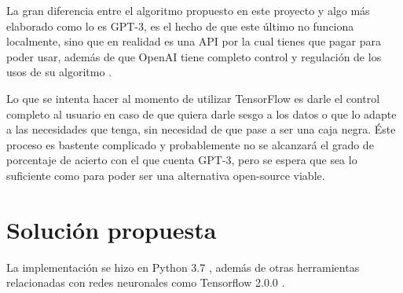 \documentclass[a4]{sciposter}
\begin{document}
\begin{multicols}{2}


La gran diferencia entre el algoritmo propuesto en este proyecto y algo más elaborado como lo es GPT-3, es el hecho de que este último no funciona localmente, sino que en realidad es una API por la cual tienes que pagar para poder usar, además de que OpenAI tiene completo control y regulación de los usos de su algoritmo \citep{openai}. 

Lo que se intenta hacer al momento de utilizar TensorFlow es darle el control completo al usuario en caso de que quiera darle sesgo a los datos o que lo adapte a las necesidades que tenga, sin necesidad de que pase a ser una caja negra. Éste proceso es bastente complicado y probablemente no se alcanzará el grado de porcentaje de acierto con el que cuenta GPT-3, pero se espera que sea lo suficiente como para poder ser una alternativa open-source viable.



\section{Solución propuesta}
La implementación se hizo en Python 3.7 \citep{python}, además de otras herramientas relacionadas con redes neuronales como Tensorflow 2.0.0 \citep{tensorflow}.



\end{multicols}
\end{document}
